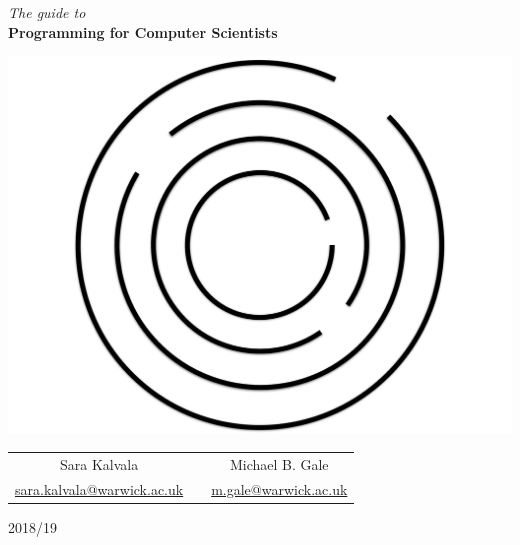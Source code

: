 \begin{titlepage}
\begin{center}
		
{\Huge \textit{The guide to}} \\[0.2cm]
{\Huge\textbf{Programming for Computer Scientists}} \\[0.2cm]

\vfill

\includegraphics[scale=0.35]{labyrinth.pdf}

\vfill 

\begin{tabular}{ccc}
	{\LARGE Sara Kalvala} & & {\LARGE Michael B. Gale} \\[0.1cm]
	{\large \href{mailto:sara.kalvala@warwick.ac.uk}{sara.kalvala@warwick.ac.uk}} & & {\large \href{mailto:m.gale@warwick.ac.uk}{m.gale@warwick.ac.uk}}
\end{tabular}


\vspace{1.5cm}

{2018/19}
\end{center}
\end{titlepage}